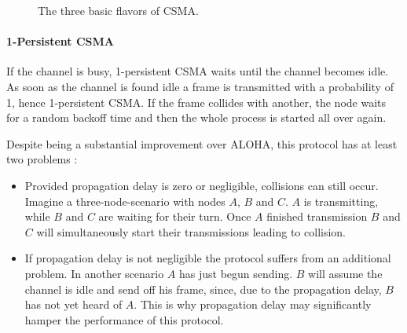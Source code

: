 \begin{figure}[tb] \label{fig:csma-flavors}
	\begin{center}
		\qquad
		\qquad
	\end{center}
\caption{The three basic flavors of CSMA.}
\end{figure}


\paragraph{1-Persistent CSMA}
\label{sec:csma-1-persistent}

If the channel is busy, 1-persistent CSMA waits until the channel becomes idle. As soon as the channel is found idle a frame is transmitted with a probability of 1, hence 1-persistent CSMA. If the frame collides with another, the node waits for a random backoff time and then the whole process is started all over again.

Despite being a substantial improvement over ALOHA, this protocol has at least two problems \cite{Tanenbaum02}:

\begin{itemize}
	\item Provided propagation delay is zero or negligible, collisions can still occur.  Imagine a three-node-scenario with nodes $A$, $B$ and $C$. $A$ is transmitting, while $B$ and $C$ are waiting for their turn. Once $A$ finished transmission $B$ and $C$ will simultaneously start their transmissions leading to collision.
	
	\item If propagation delay is not negligible the protocol suffers from an additional problem. In another scenario $A$ has just begun sending. $B$ will assume the channel is idle and send off his frame, since, due to the propagation delay, $B$ has not yet heard of $A$. This is why propagation delay may significantly hamper the performance of this protocol.
\end{itemize}  

